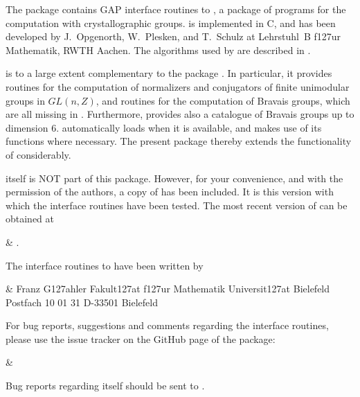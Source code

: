 

The package {\Carat} contains GAP interface routines to {\CARAT}, 
a package of programs for the computation with crystallographic
groups. {\CARAT} is implemented in C, and has been developed by
J.~Opgenorth, W.~Plesken, and T.~Schulz at Lehrstuhl~B f\accent127ur 
Mathematik, RWTH Aachen. The algorithms used by {\CARAT} are described 
in \cite{OPS98}. 

{\CARAT} is to a large extent complementary to the {\GAP} package
{\Cryst}. In particular, it provides routines for the computation 
of normalizers and conjugators of finite unimodular groups in $GL(n,Z)$,
and routines for the computation of Bravais groups, which are all 
missing in {\Cryst}.  Furthermore, {\CARAT} provides also a catalogue of 
Bravais groups up to dimension 6. {\Cryst} automatically loads {\CARAT}
when it is available, and makes use of its functions where necessary. 
The present package thereby extends the functionality of {\Cryst} 
considerably.

{\CARAT} itself is NOT part of this package. However, for your convenience,
and with the permission of the {\CARAT} authors, a copy of {\CARAT} 
has been included. It is this version with which the interface routines 
have been tested. The most recent version of {\CARAT} can be obtained at 

\beginitems
&
.
\enditems
 
The {\GAP} interface routines to {\CARAT} have been written by

\beginitems
&
Franz G\accent127ahler\hfill\break
Fakult\accent127at f\accent127ur Mathematik\hfill\break
Universit\accent127at Bielefeld\hfill\break
Postfach 10 01 31\hfill\break
D-33501 Bielefeld\hfill\break
{}
\enditems

For bug reports, suggestions and comments regarding the interface routines, 
please use the issue tracker on the GitHub page of the package:

\beginitems
&
\enditems

Bug reports regarding {\CARAT} itself should be sent to
.

